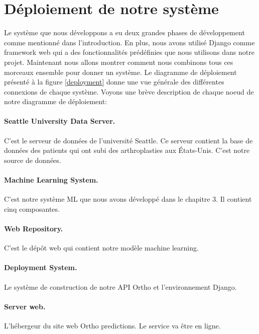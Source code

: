\documentclass[12pt, french]{report}
\begin{document}
\newpage

\section{Déploiement de notre système}
Le système que nous développons a eu deux grandes phases de développement comme mentionné dans l'introduction. En plus, nous avons utilisé Django comme framework web qui a des fonctionnalités prédéfinies que nous utilisons dans notre projet. Maintenant nous allons montrer comment nous combinons tous ces morceaux ensemble pour donner un système. Le diagramme de déploiement présenté à la figure \ref{deployment} donne une vue générale des différentes connexions de chaque système. Voyons une brève description de chaque noeud de notre diagramme de déploiement:
\paragraph{Seattle University Data Server. } C'est le serveur de données de l'université Seattle. Ce serveur contient la base de données des patients qui ont subi des arthroplasties aux États-Unis. C'est notre source de données.
\paragraph{Machine Learning System. } C'est notre système ML que nous avons développé dans le chapitre 3. Il contient cinq composantes.
\paragraph{Web Repository. } C'est le dépôt web qui contient notre modèle machine learning.
\paragraph{Deployment System. } Le système de construction de notre API Ortho et l'environnement Django.
\paragraph{Server web. } L'hébergeur du site web Ortho predictions. Le service va être en ligne. 
\end{document}
